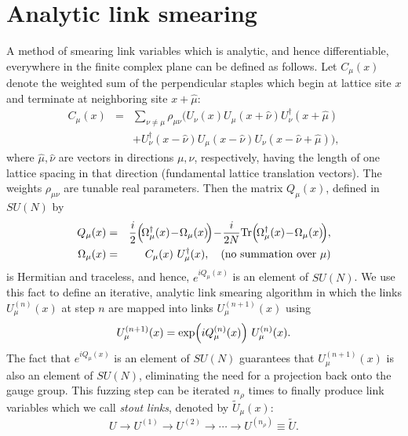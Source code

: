 \section{Analytic link smearing}
\label{sec:analytic}

A method of smearing link variables which is analytic, and hence
differentiable, everywhere in the finite complex plane
can be defined as follows.
Let $C_\mu(x)$ denote the weighted sum of the perpendicular staples which
begin at lattice site $x$ and terminate at neighboring site 
$x\!+\!\hat{\mu}$:
\begin{eqnarray}
 C_\mu(x)&=&\sum_{\nu\neq \mu}\rho_{\mu\nu}\biggl(
 U_\nu(x) U_\mu(x\!+\!\hat{\nu}) U_\nu^\dagger(x\!+\!\hat{\mu})\nonumber\\
&&+ U^\dagger_\nu(x\!-\!\hat{\nu}) U_\mu(x\!-\!\hat{\nu})
  U_\nu(x\!-\!\hat{\nu}\!+\!\hat{\mu})
\biggr), \label{eq:Cdef}
\end{eqnarray}
where $\hat{\mu},\hat{\nu}$ are vectors in directions $\mu,\nu$,
respectively, having the length
of one lattice spacing in that direction (fundamental lattice
translation vectors).  The weights $\rho_{\mu\nu}$ are tunable real
parameters. Then the matrix $Q_\mu(x)$, defined in $SU(N)$ by
\begin{eqnarray}
Q_\mu(x) &=& 
  \frac{i}{2}\Bigl(\!\Omega^\dagger_\mu(x)\!-\!\Omega_\mu(x)\!\Bigr)
   \!-\!\frac{i}{2N}\Tr\Bigl(\!\Omega^\dagger_\mu(x)
  \!-\!\Omega_\mu(x)\!\Bigr),\nonumber\\
\Omega_\mu(x) &=& C_\mu(x)\ U_\mu^\dagger(x),
   \quad\mbox{(no summation over $\mu$)} \label{eq:Qdef}
\end{eqnarray}
is Hermitian and traceless, and hence, $e^{i Q_\mu(x)}$ is an
element of $SU(N)$.  
We use this fact to define an iterative, analytic link
smearing algorithm in which the links $U_\mu^{(n)}(x)$ at step $n$
are mapped into links $U_\mu^{(n+1)}(x)$ using
\begin{equation}
U^{(n+1)}_\mu(x)=\exp\Bigl(i Q_\mu^{(n)}(x)\Bigr)\ U_\mu^{(n)}(x).
\label{eq:Ustout}
\end{equation}
The fact that $e^{iQ_\mu(x)}$
is an element of $SU(N)$ guarantees that $U^{(n+1)}_\mu(x)$ is also an element
of $SU(N)$, eliminating the need for a projection back onto the gauge group.
This fuzzing step can be iterated $n_\rho$ times to finally
produce link variables which we call {\em stout links}\cite{pub},
denoted by $\tilde{U}_\mu(x)$:
\begin{equation}
 U\rightarrow U^{(1)}\rightarrow U^{(2)}\rightarrow\cdots\rightarrow
  U^{(n_\rho)}\equiv \tilde{U}.
\end{equation}

